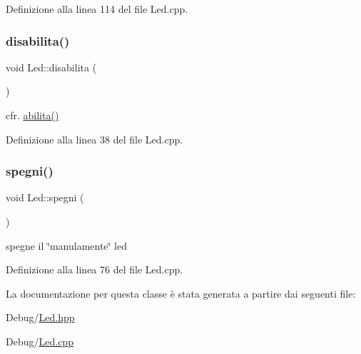 Definizione alla linea 114 del file Led.\+cpp.

\mbox{\label{class_led_a0a8956cf88323db574ce0557a98a2393}} 
\subsubsection{\texorpdfstring{disabilita()}{disabilita()}}
{\footnotesize\ttfamily void Led\+::disabilita (\begin{DoxyParamCaption}{ }\end{DoxyParamCaption})}



cfr. {\ttfamily \hyperlink{class_led_a7334b8983c471eb8ef81c5b6ac1a2f95}{abilita()}} 



Definizione alla linea 38 del file Led.\+cpp.

\mbox{\label{class_led_a7c9cdfb5a31aff4dfd8199b664b390cc}} 
\subsubsection{\texorpdfstring{spegni()}{spegni()}}
{\footnotesize\ttfamily void Led\+::spegni (\begin{DoxyParamCaption}{ }\end{DoxyParamCaption})}



spegne il \char`\"{}manulamente\char`\"{} led 



Definizione alla linea 76 del file Led.\+cpp.



La documentazione per questa classe è stata generata a partire dai seguenti file\+:\begin{DoxyCompactItemize}
\item 
Debug/\hyperlink{_led_8hpp}{Led.\+hpp}\item 
Debug/\hyperlink{_led_8cpp}{Led.\+cpp}\end{DoxyCompactItemize}
